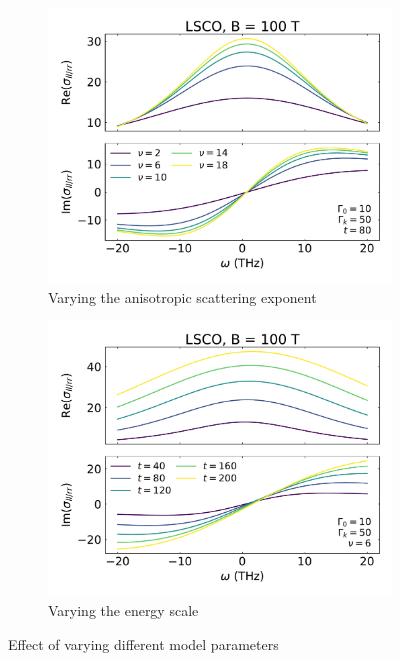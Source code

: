 \documentclass[12pt]{article}
\begin{document}
\begin{figure}
\begin{subfigure}{0.495\textwidth}
        \includegraphics[width=\textwidth]{figures/vary_power}
        \caption{Varying the anisotropic scattering exponent}
    \end{subfigure}
    \begin{subfigure}{0.495\textwidth}
        \includegraphics[width=\textwidth]{figures/vary_energy_scale}
        \caption{Varying the energy scale}
        
    \end{subfigure}
    \caption{Effect of varying different model parameters}
    \label{fig:vary_parameters}
\end{figure}
\end{document}
